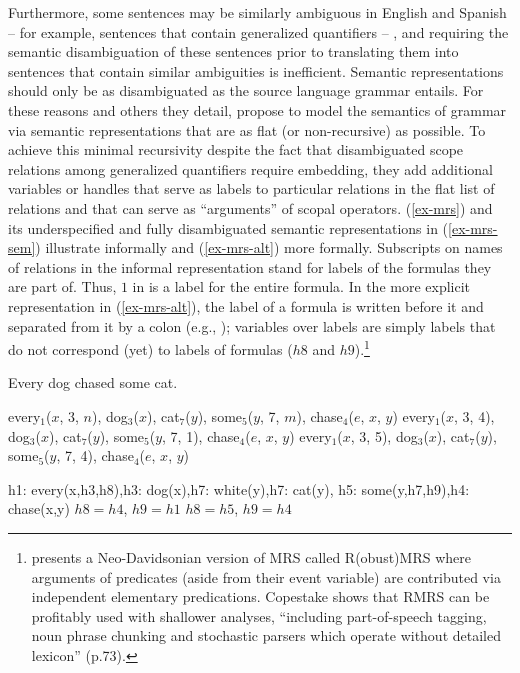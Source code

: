 \documentclass[output=paper]{langsci/langscibook}
\begin{document}
Furthermore, some sentences may be similarly ambiguous in English and Spanish -- for example, sentences that contain generalized quantifiers -- , and requiring the semantic disambiguation of these sentences prior to translating them into sentences that contain similar ambiguities is inefficient. Semantic representations should only be as disambiguated as the source language grammar entails. For these reasons and others they detail, \citet{Copestakeetal1995} propose to model the semantics of grammar via semantic representations that are as flat (or non-recursive) as possible. To achieve this minimal recursivity despite the fact that disambiguated scope relations among generalized quantifiers require embedding, they add additional variables or handles that serve as labels to particular relations in the flat list of relations and that can serve as ``arguments'' of scopal operators. (\ref{ex-mrs}) and its underspecified and fully disambiguated semantic representations in (\ref{ex-mrs-sem}) illustrate informally and (\ref{ex-mrs-alt}) more formally. Subscripts on names of relations in the informal representation stand for labels of the formulas they are part of. Thus, $1$ in  is a label for the entire formula. In the more explicit representation in (\ref{ex-mrs-alt}), the label of a formula is written before it and separated from it by a colon (e.g., ); variables over labels are simply labels that do not correspond (yet) to labels of formulas ($h8$ and $h9$).\footnote{\citet{Copestake2007} presents a Neo-Davidsonian version of MRS called R(obust)MRS where arguments of predicates (aside from their event variable) are contributed via independent elementary predications. Copestake shows that RMRS can be profitably used with shallower analyses, ``including part-of-speech tagging, noun phrase chunking and stochastic parsers which operate without detailed lexicon'' (p.73).}

\begin{exe}
\ex\label{ex-mrs}
Every dog chased some cat.
\ex\label{ex-mrs-sem}
\begin{xlist}
\ex\label{ex-mrs-sem-a}
every$_{1}$($x$, 3, $n$), dog$_{3}$($x$), cat$_{7}$($y$), some$_{5}$($y$, 7, $m$), chase$_{4}$($e$, $x$, $y$)
\ex\label{ex-mrs-sem-b}
every$_{1}$($x$, 3, 4), dog$_{3}$($x$), cat$_{7}$($y$), some$_{5}$($y$, 7, 1), chase$_{4}$($e$, $x$, $y$)
\ex\label{ex-mrs-sem-c}
every$_{1}$($x$, 3, 5), dog$_{3}$($x$), cat$_{7}$($y$), some$_{5}$($y$, 7, 4), chase$_{4}$($e$, $x$, $y$)
\end{xlist}
\ex\label{ex-mrs-alt}
\begin{xlist}
\ex\label{ex-mrs-alt-a}
h1: every(x,h3,h8),h3: dog(x),h7: white(y),h7: cat(y), h5: some(y,h7,h9),h4: chase(x,y)
\ex\label{ex-mrs-alt-b}
$h8 = h4$, $h9 =h1$
\ex\label{ex-mrs-alt-c}
$h8 = h5$, $h9 =h4$
\end{xlist}
\end{exe} 
\end{document}
